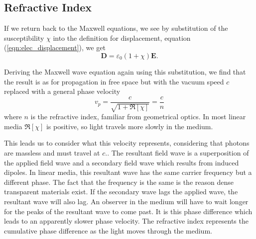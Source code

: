   \subsection{Refractive Index}

    If we return back to the Maxwell equations, we see by substitution of the
    susceptibility $\chi$ into the definition for displacement, equation 
    (\ref{eqn:elec_displacement}), we get
    \begin{equation}
        \mathbf{D} = \varepsilon_0 (1 + \chi) \mathbf{E}.
    \end{equation}

    Deriving the Maxwell wave equation again using this substitution, we find
    that the result is as for propagation in free space but with the vacuum
    speed $c$ replaced with a general phase velocity      
    \begin{equation}
        v_p = \frac{c}{\sqrt{1 + \Re \left[ \chi \right] }} = \frac{c}{n}
        \label{eqn:phase_vel_refr}
    \end{equation}
    where $n$ is the refractive index, familiar from geometrical optics. In most
    linear media $\Re \left[ \chi \right]$ is positive, so light travels more
    slowly in the medium.\cite{James1992}

    This leads us to consider what this velocity represents, considering that
    photons are massless and must travel at $c$.\cite{feynman1963feynman}. The
    resultant field wave is a superposition of the applied field wave and a
    secondary field wave which results from induced dipoles. In linear media,
    this resultant wave has the same carrier frequency but a different phase.
    The fact that the frequency is the same is the reason dense transparent
    materials exist. If the secondary wave lags the applied wave, the resultant
    wave will also lag. An observer in the medium will have to wait longer for
    the peaks of the resultant wave to come past. It is this phase difference
    which leads to an apparently slower phase velocity. The refractive index
    represents the cumulative phase difference as the light moves through the
    medium.\cite{hecht2015optics}

  
